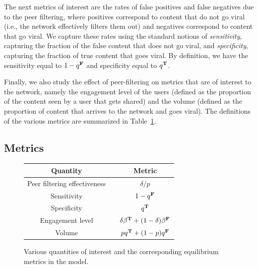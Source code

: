 The next metrics of interest are the rates of false positives and false negatives due to the peer filtering, where positives correspond to content that do not go viral (i.e., the network effectively filters them out) and negatives correspond to content that go viral. We capture these rates using the standard notions of {\em sensitivity}, capturing the fraction of the false content that does not go viral, and {\em specificity}, capturing the fraction of true content that goes viral. By definition, we have the sensitivity equal to $1- q^{\mathbf{F}}$ and specificity equal to $q^{\mathbf{T}}$. 

Finally, we also study the effect of peer-filtering on metrics that are of interest to the network, namely the engagement level of the users (defined as the proportion of the content seen by a user that gets shared) and the volume (defined as the proportion of content that arrives to the network and goes viral). The definitions of the various metrics are summarized in Table~\ref{table:metrics}.


\subsection{Metrics}


{\small 
\begin{figure}
\centering
\begin{tabular}{ccc} 
  \toprule
 Quantity  & & Metric \\
 \midrule
 Peer filtering effectiveness &   & ${\delta}/{p}$ \\
  Sensitivity & & $1- q^{\mathbf{F}}$\\
 Specificity  & & $q^{\mathbf{T}}$\\
 Engagement level & & $\delta \beta^{\mathbf{T}} + (1-\delta) \beta^{\mathbf{F}}$\\
 Volume &  & $pq^{\mathbf{T}} + (1-p) q^{\mathbf{F}}$\\
  \bottomrule
\end{tabular}
\caption{Various quantities of interest and the corresponding equilibrium metrics in the model.}\label{table:metrics}

\end{figure} }

